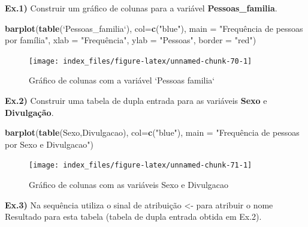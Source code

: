 \documentclass[12pt,brazil,oneside]{book}
\newenvironment{Shaded}{\begin{snugshade}}{\end{snugshade}}
\newcommand{\DataTypeTok}[1]{\textcolor[rgb]{0.13,0.29,0.53}{#1}}
\newcommand{\KeywordTok}[1]{\textcolor[rgb]{0.13,0.29,0.53}{\textbf{#1}}}
\newcommand{\NormalTok}[1]{#1}
\newcommand{\StringTok}[1]{\textcolor[rgb]{0.31,0.60,0.02}{#1}}
\begin{document}
\textbf{Ex.1)} Construir um gráfico de colunas para a variável \textbf{Pessoas\_familia}.

\begin{Shaded}
\begin{Highlighting}[]
\KeywordTok{barplot}\NormalTok{(}\KeywordTok{table}\NormalTok{(}\StringTok{`}\DataTypeTok{Pessoas_familia}\StringTok{`}\NormalTok{), }\DataTypeTok{col=}\KeywordTok{c}\NormalTok{(}\StringTok{"blue"}\NormalTok{), }
        \DataTypeTok{main =} \StringTok{"Frequência de pessoas por família"}\NormalTok{, }
        \DataTypeTok{xlab =} \StringTok{"Frequência", }
\StringTok{        ylab = "}\NormalTok{Pessoas}\StringTok{", }
\StringTok{        border = "}\NormalTok{red}\StringTok{")}
\end{Highlighting}
\end{Shaded}

\begin{figure}[H]

{\centering \texttt{[image: index\_files/figure-latex/unnamed-chunk-70-1]} 

}

\caption{Gráfico de colunas com a variável `Pessoas familia`}\label{fig:unnamed-chunk-70}
\end{figure}

\textbf{Ex.2)} Construir uma tabela de dupla entrada para as variáveis \textbf{Sexo} e \textbf{Divulgação}.

\begin{Shaded}
\begin{Highlighting}[]
\KeywordTok{barplot}\NormalTok{(}\KeywordTok{table}\NormalTok{(Sexo,Divulgacao), }
        \DataTypeTok{col=}\KeywordTok{c}\NormalTok{(}\StringTok{"blue"}\NormalTok{), }
        \DataTypeTok{main =} \StringTok{"Frequência de pessoas por Sexo e Divulgacao"}\NormalTok{)}
\end{Highlighting}
\end{Shaded}

\begin{figure}[H]

{\centering \texttt{[image: index\_files/figure-latex/unnamed-chunk-71-1]} 

}

\caption{Gráfico de colunas com as variáveis Sexo e Divulgacao}\label{fig:unnamed-chunk-71}
\end{figure}

\textbf{Ex.3)} Na sequência utiliza o sinal de atribuição \textless{}- para atribuir o nome Resultado para esta tabela (tabela de dupla entrada obtida em Ex.2).
\end{document}

